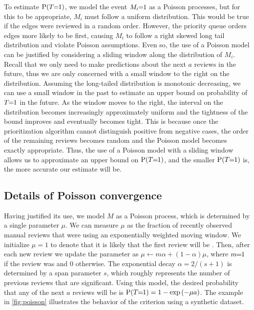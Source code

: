 To estimate $\mathbin{\operatorname{P}}(T\mkern-6mu=\mkern-6mu1)$, we model the event $M_i\mkern-6mu=\mkern-6mu1$ as a Poisson processes, but for this to be appropriate,
  $M_i$ must follow a uniform distribution.
This would be true if the edges were reviewed in a random order.
However, the priority queue orders edges more likely to be \meaningful{} first, causing $M_i$ to follow a right
  skewed long tail distribution and violate Poisson assumptions.
Even so, the use of a Poisson model can be justified by considering a sliding window along the distribution of
  $M_i$.
Recall that we only need to make predictions about the next $a$ reviews in the future, thus we are only concerned
  with a small window to the right on the distribution.
Assuming the long-tailed distribution is monotonic decreasing, we can use a small window in the past to estimate
  an upper bound on probability of $T\mkern-6mu=\mkern-6mu1$ in the future.
As the window moves to the right, the interval on the distribution becomes increasingly approximately uniform and
  the tightness of the bound improves and eventually becomes tight.
This is because once the prioritization algorithm cannot distinguish positive from negative cases, the order of
  the remaining reviews becomes random and the Poisson model becomes exactly appropriate.
Thus, the use of a Poisson model with a sliding window allows us to approximate an upper bound on $\mathbin{\operatorname{P}}(T\mkern-6mu=\mkern-6mu1)$,
  and the smaller $\mathbin{\operatorname{P}}(T\mkern-6mu=\mkern-6mu1)$ is, the more accurate our estimate will be.


\subsection{Details of Poisson convergence}

Having justified its use, we model $M$ as a Poisson process, which is determined by a single parameter $\mu$.
We can measure $\mu$ as the fraction of recently observed manual reviews that were \meaningful{} using an
  exponentially weighted moving window.
We initialize $\mu=1$ to denote that it is likely that the first review will be \meaningful{}.
Then, after each new review we update the parameter as %
$\mu \leftarrow m \alpha + (1 - \alpha) \mu$, where $m\mkern-6mu=\mkern-6mu1$ if the review was \meaningful{} and $0$ otherwise.
The exponential decay $\alpha = 2 / (s + 1)$ is determined by a span parameter $s$, which roughly represents the
  number of previous reviews that are significant.
Using this model, the desired probability that any of the next $a$ reviews will be \meaningful{} is %
$\mathbin{\operatorname{P}}(T\mkern-6mu=\mkern-6mu1) = 1 - \textrm{exp}\left(-\mu  a\right)$.
The example in \cref{fig:poisson} illustrates the behavior of the criterion using a synthetic dataset.

